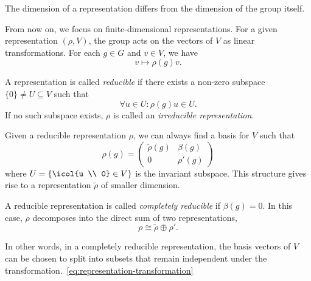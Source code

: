 \begin{remark}
    The dimension of a representation differs from the dimension of the group itself.
\end{remark}

From now on, we focus on finite-dimensional representations. For a given representation $(\rho, V)$, the group acts on the vectors of $V$ as linear transformations. For each $g \in G$ and $v \in V$, we have
\begin{equation}\label{eq:representation-transformation}
    v \mapsto \rho(g) v .
\end{equation}

\begin{definition}\label{def:reducible-rep}
    A representation is called \emph{reducible} if there exists a non-zero subspace $\{0\} \neq U \subseteq V$ such that
\begin{equation}
    \forall u \in U \colon \rho(g)u \in U.
\end{equation}
If no such subspace exists, $\rho$ is called an \emph{irreducible representation}.
\end{definition}

 Given a reducible representation $\rho$, we can always find a basis for $V$ such that
\begin{equation}
    \rho(g) = 
    \begin{pmatrix}
        \tilde{\rho}(g) & \beta(g) \\
        0 & \rho'(g)
    \end{pmatrix}
\end{equation}
where $U = \{ \icol{u \\ 0} \in V \}$ is the invariant subspace. This structure gives rise to a representation $\tilde{\rho}$ of smaller dimension. 

\begin{definition}
    A reducible representation is called \emph{completely reducible} if $\beta(g) = 0$. In this case, $\rho$ decomposes into the direct sum of two representations,
\begin{equation}
    \rho \cong \tilde{\rho} \oplus \rho' .
\end{equation}
\end{definition}

In other words, in a completely reducible representation, the basis vectors of $V$ can be chosen to split into subsets that remain independent under the transformation.~\eqref{eq:representation-transformation}

